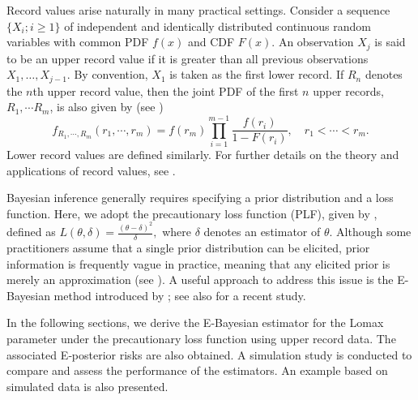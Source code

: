 \documentclass[twoside]{article}
\begin{document}
Record values arise naturally in many practical settings. Consider a sequence $\{X_i; i\geq 1\}$ of independent and identically distributed continuous random variables with common PDF $f(x)$ and CDF $F(x)$. An observation $X_j$ is said to be an upper record value if it is greater than all previous observations $X_1, \ldots, X_{j-1}$. By convention, $X_1$ is taken as the first lower record. If $R_n$ denotes the $n$th upper record value, %
then the joint PDF of the first $n$ upper records, $R_1,\cdots R_m$, is also given by (see  \cite{Arnold:et:al:1998})
\begin{equation}\label{like}
f_{R_1,\cdots, R_m}(r_1,\cdots, r_m)=f(r_m)\prod_{i=1}^{m-1}\dfrac{f(r_i)}{1-F(r_i)}, \quad r_1<\cdots < r_m.
\end{equation}
Lower record values are defined similarly. For further details on the theory and applications of record values, see \cite{Arnold:et:al:1998}.

Bayesian inference generally requires specifying a prior distribution and a loss function. Here, we adopt the precautionary loss function (PLF), given by \cite{Norstorm:1996}, defined as
$	\displaystyle L(\theta,\delta)= \frac{(\theta-\delta)^2}{\delta},$
where $\delta$ denotes an estimator of $\theta$. Although some practitioners assume that a single prior distribution can be elicited, prior information is frequently vague in practice, meaning that any elicited prior is merely an approximation (see \cite{Alhamaidah:et:al:2023}). A useful approach to address this issue is the E-Bayesian method introduced by \cite{Han:1997}; see also \cite{Alhamaidah:et:al:2023} for a recent study. 

In the following sections, we derive the E‑Bayesian estimator for the Lomax parameter under the precautionary loss function using upper record data. The associated E‑posterior risks are also obtained. A simulation study is conducted to compare and assess the performance of the estimators. An example based on simulated data is also presented.
\end{document}
